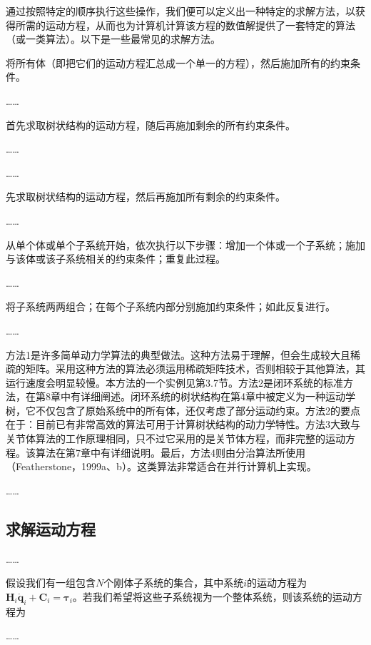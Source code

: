 \documentclass[10pt,a4paper]{book}
\theoremstyle{thmstyle} %
\theoremstyle{defstyle} %
\theoremstyle{prostyle} %
\begin{document}
通过按照特定的顺序执行这些操作，我们便可以定义出一种特定的求解方法，以获得所需的运动方程，从而也为计算机计算该方程的数值解提供了一套特定的算法（或一类算法）。以下是一些最常见的求解方法。

将所有体（即把它们的运动方程汇总成一个单一的方程），然后施加所有的约束条件。

……

首先求取树状结构的运动方程，随后再施加剩余的所有约束条件。

……

……

先求取树状结构的运动方程，然后再施加所有剩余的约束条件。

……

从单个体或单个子系统开始，依次执行以下步骤：增加一个体或一个子系统；施加与该体或该子系统相关的约束条件；重复此过程。

……

将子系统两两组合；在每个子系统内部分别施加约束条件；如此反复进行。

……

方法1是许多简单动力学算法的典型做法。这种方法易于理解，但会生成较大且稀疏的矩阵。采用这种方法的算法必须运用稀疏矩阵技术，否则相较于其他算法，其运行速度会明显较慢。本方法的一个实例见第3.7节。方法2是闭环系统的标准方法，在第8章中有详细阐述。闭环系统的树状结构在第4章中被定义为一种运动学树，它不仅包含了原始系统中的所有体，还仅考虑了部分运动约束。方法2的要点在于：目前已有非常高效的算法可用于计算树状结构的动力学特性。方法3大致与关节体算法的工作原理相同，只不过它采用的是关节体方程，而非完整的运动方程。该算法在第7章中有详细说明。最后，方法4则由分治算法所使用（Featherstone，1999a、b）。这类算法非常适合在并行计算机上实现。

……

\subsection{求解运动方程}



……

假设我们有一组包含$N$个刚体子系统的集合，其中系统$i$的运动方程为$\boldsymbol{H}_{i}\ddot{\boldsymbol{q}}_{i}+\boldsymbol{C}_{i}=\boldsymbol{\tau}_{i}$。若我们希望将这些子系统视为一个整体系统，则该系统的运动方程为

……
\end{document}
